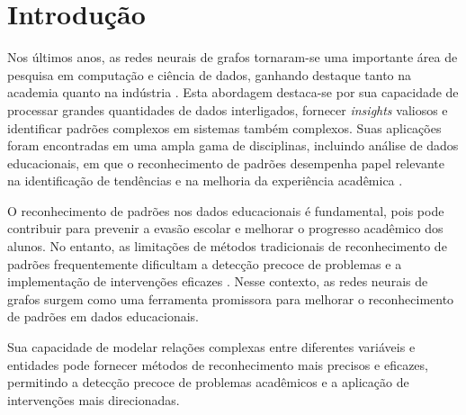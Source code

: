 \chapter{Introdu\c{c}\~ao}
\label{pre:introducao}

Nos \'ultimos anos, as redes neurais de grafos tornaram-se uma importante \'area de pesquisa em computa\c{c}\~ao e ci\^encia de dados, ganhando destaque tanto na academia quanto na ind\'ustria \cite{kipf2017}. Esta abordagem destaca-se por sua capacidade de processar grandes quantidades de dados interligados, fornecer \textit{insights} valiosos e identificar padr\~oes complexos em sistemas tamb\'em complexos. Suas aplica\c{c}\~oes foram encontradas em uma ampla gama de disciplinas, incluindo an\'alise de dados educacionais, em que o reconhecimento de padr\~oes desempenha papel relevante na identifica\c{c}\~ao de tend\^encias e na melhoria da experi\^encia acad\^emica \cite{wang2021}.

O reconhecimento de padr\~oes nos dados educacionais \'e fundamental, pois pode contribuir para prevenir a evas\~ao escolar e melhorar o progresso acad\^emico dos alunos. No entanto, as limita\c{c}\~oes de m\'etodos tradicionais de reconhecimento de padr\~oes frequentemente dificultam a detec\c{c}\~ao precoce de problemas e a implementa\c{c}\~ao de interven\c{c}\~oes eficazes \cite{jain2020}. Nesse contexto, as redes neurais de grafos surgem como uma ferramenta promissora para melhorar o reconhecimento de padr\~oes em dados educacionais.

Sua capacidade de modelar rela\c{c}\~oes complexas entre diferentes vari\'aveis e entidades pode fornecer m\'etodos de reconhecimento mais precisos e eficazes, permitindo a detec\c{c}\~ao precoce de problemas acad\^emicos e a aplica\c{c}\~ao de interven\c{c}\~oes mais direcionadas.
